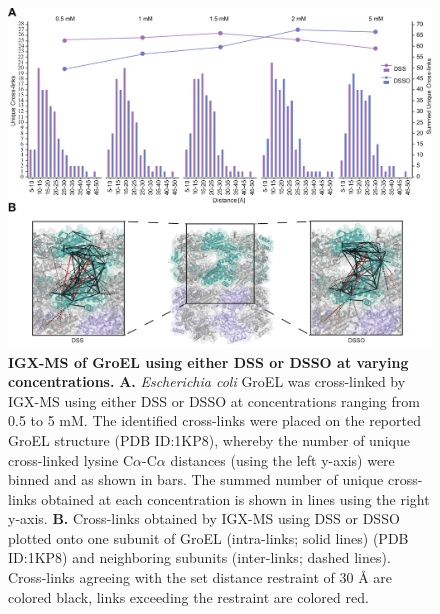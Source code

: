 \begin{figure}[htb]
	\center
	\includegraphics[]{Chapter.2/Figures/Figure2.png}
	\caption{\textbf{IGX-MS of GroEL using either DSS or DSSO at varying concentrations.} \textbf{A.} \emph{Escherichia coli} GroEL was cross-linked by IGX-MS using either DSS or DSSO at concentrations ranging from 0.5 to 5 mM. The identified cross-links were placed on the reported GroEL structure (PDB ID:1KP8), whereby the number of unique cross-linked lysine C$\alpha$-C$\alpha$ distances (using the left y-axis) were binned and as shown in bars. The summed number of unique cross-links obtained at each concentration is shown in lines using the right y-axis. \textbf{B.} Cross-links obtained by IGX-MS using DSS or DSSO plotted onto one subunit of GroEL (intra-links; solid lines) (PDB ID:1KP8) and neighboring subunits (inter-links; dashed lines). Cross-links agreeing with the set distance restraint of 30 Å are colored black, links exceeding the restraint are colored red.}
	\label{fig:ch2_fig2}
\end{figure}
